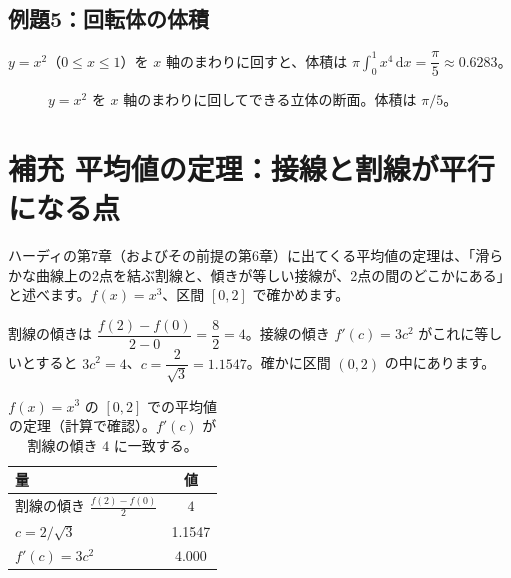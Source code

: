 \documentclass[a4paper,11pt,openany]{ltjsbook}
\newcommand{\dd}{\mathrm{d}}
\begin{document}
\subsection*{例題5：回転体の体積}

$y=x^2$（$0\le x\le1$）を $x$ 軸のまわりに回すと、体積は $\pi\displaystyle\int_0^1x^4\,\dd x=\dfrac{\pi}{5}\approx0.6283$。

\begin{figure}[htbp]
\centering
{}
\caption{$y=x^2$ を $x$ 軸のまわりに回してできる立体の断面。体積は $\pi/5$。}
\end{figure}

\section{補充 平均値の定理：接線と割線が平行になる点}

ハーディの第7章（およびその前提の第6章）に出てくる平均値の定理は、「滑らかな曲線上の2点を結ぶ割線と、傾きが等しい接線が、2点の間のどこかにある」と述べます。$f(x)=x^3$、区間 $[0,2]$ で確かめます。

割線の傾きは $\dfrac{f(2)-f(0)}{2-0}=\dfrac82=4$。接線の傾き $f'(c)=3c^2$ がこれに等しいとすると $3c^2=4$、$c=\dfrac2{\sqrt3}=1.1547$。確かに区間 $(0,2)$ の中にあります。

\begin{table}[htbp]
\centering
\begin{tabular}{lc}
\toprule
量 & 値\\
\midrule
割線の傾き $\tfrac{f(2)-f(0)}{2}$ & $4$\\
$c=2/\sqrt3$ & 1.1547\\
$f'(c)=3c^2$ & $4.000$\\
\bottomrule
\end{tabular}
\caption{$f(x)=x^3$ の $[0,2]$ での平均値の定理（計算で確認）。$f'(c)$ が割線の傾き $4$ に一致する。}
\end{table}
\end{document}
